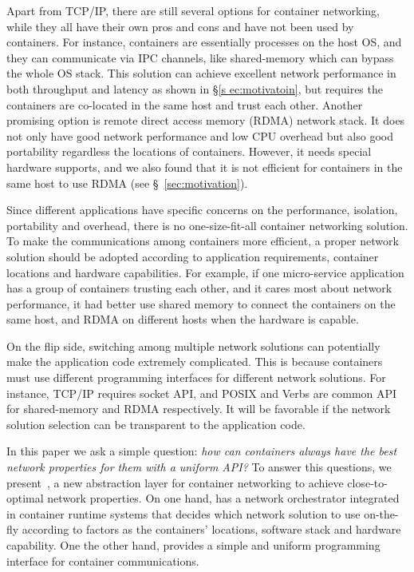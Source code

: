 Apart from TCP/IP, there are still several options for container networking,
while they all have their own pros and cons and have not been used by containers.
For instance, containers are essentially processes on the host OS, and they can 
communicate via IPC channels, like shared-memory which can bypass the whole OS 
stack. This solution can achieve
excellent network performance in both throughput and latency as shown in \S\ref{s
ec:motivatoin}, but requires the containers are co-located in the same host and 
trust each other. Another promising option is remote direct access memory (RDMA) network stack. It does not only have good network performance and low CPU overhead but also good portability regardless the locations of containers. 
However, it needs special hardware supports, and we also found that it is not efficient for containers in the same host to use RDMA
(see \S~\ref{sec:motivation}). 

Since different applications have specific concerns on the performance, 
isolation, portability and overhead, there is no
one-size-fit-all container networking solution. To make the communications among
containers more efficient, a proper network solution should be adopted according
to application requirements, container locations and hardware capabilities.
For example, if one micro-service application has a group of containers trusting each other, and it cares most about network performance, it had better use
shared memory to connect the containers on the same host, and RDMA on different hosts when the hardware is capable. 

On the flip side, switching among multiple network solutions can potentially 
make the application code extremely complicated. This is because
containers must use different programming interfaces for different
network solutions. For instance, TCP/IP requires socket API, and POSIX and Verbs
are common API for shared-memory and RDMA respectively. 
It will be favorable if the network solution selection can be transparent to the application code.

In this paper we ask a simple question: {\em how can containers always have the best network properties for them with a uniform API?}
To answer this questions, we present~\sysname, a new abstraction layer for container networking to achieve close-to-optimal network properties. 
On one hand, \sysname has a network orchestrator integrated in container runtime systems that decides which network solution to use on-the-fly according to factors as the containers' locations, software stack and hardware capability. One the other hand, \sysname provides a simple and uniform programming interface for container communications.   

